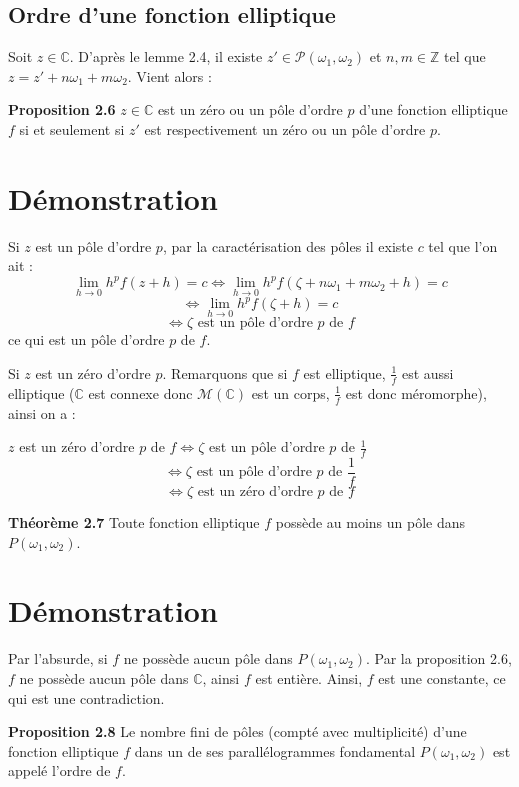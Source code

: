 \documentclass{article}
\begin{document}
\subsection{Ordre d'une fonction elliptique}

Soit $z \in \mathbb{C}$. D'après le lemme 2.4, il existe $z' \in \mathcal{P}(\omega_1, \omega_2)$ et $n, m \in \mathbb{Z}$ tel que $z = z' + n \omega_1 + m \omega_2$. Vient alors :

\textbf{Proposition 2.6}
$z \in \mathbb{C}$ est un zéro ou un pôle d'ordre $p$ d'une fonction elliptique $f$ si et seulement si $z'$ est respectivement un zéro ou un pôle d'ordre $p$.

\section*{Démonstration}

Si $z$ est un pôle d'ordre $p$, par la caractérisation des pôles il existe $c$ tel que l'on ait :
\[
\lim_{h \to 0} h^p f(z + h) = c \iff \lim_{h \to 0} h^p f(\zeta + n\omega_1 + m\omega_2 + h) = c
\]
\[
\iff \lim_{h \to 0} h^p f(\zeta + h) = c
\]
\[
\iff \zeta \text{ est un pôle d'ordre } p \text{ de } f
\]
ce qui est un pôle d'ordre $p$ de $f$.

Si $z$ est un zéro d'ordre $p$. Remarquons que si $f$ est elliptique, $\frac{1}{f}$ est aussi elliptique ($\mathbb{C}$ est connexe donc $\mathcal{M}(\mathbb{C})$ est un corps, $\frac{1}{f}$ est donc méromorphe), ainsi on a :

$z$ est un zéro d'ordre $p$ de $f \iff \zeta$ est un pôle d'ordre $p$ de $\frac{1}{f}$ 
\[
\iff \zeta \text{ est un pôle d'ordre } p \text{ de } \frac{1}{f}
\]
\[
\iff \zeta \text{ est un zéro d'ordre } p \text{ de } f
\]

\textbf{Théorème 2.7}
Toute fonction elliptique $f$ possède au moins un pôle dans $P(\omega_1, \omega_2)$.


\section*{Démonstration}

Par l'absurde, si $f$ ne possède aucun pôle dans $P(\omega_1, \omega_2)$. Par la proposition 2.6, $f$ ne possède aucun pôle dans $\mathbb{C}$, ainsi $f$ est entière. Ainsi, $f$ est une constante, ce qui est une contradiction.

\textbf{Proposition 2.8}
Le nombre fini de pôles (compté avec multiplicité) d'une fonction elliptique $f$ dans un de ses parallélogrammes fondamental $P(\omega_1, \omega_2)$ est appelé l'ordre de $f$.
\end{document}
